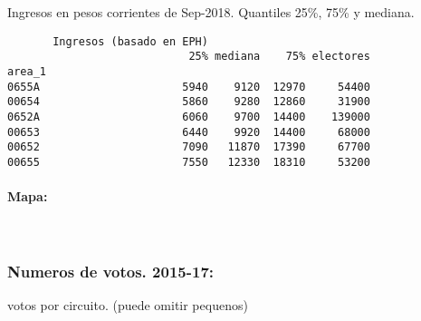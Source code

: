 \documentclass[11pt]{article}
\begin{document}
    
    Ingresos en pesos corrientes de Sep-2018. Quantiles 25\%, 75\% y
mediana.

    
    
    \begin{verbatim}
       Ingresos (basado en EPH)                         
                            25% mediana    75% electores
area_1                                                  
0655A                      5940    9120  12970     54400
00654                      5860    9280  12860     31900
0652A                      6060    9700  14400    139000
00653                      6440    9920  14400     68000
00652                      7090   11870  17390     67700
00655                      7550   12330  18310     53200
    \end{verbatim}

    
    \hypertarget{mapa}{%
\paragraph{Mapa:}\label{mapa}}

    
    \begin{center}
    \end{center}
    { \hspace*{\fill} \\}
    
    \hypertarget{numeros-de-votos.-2015-17}{%
\subsubsection{Numeros de votos.
2015-17:}\label{numeros-de-votos.-2015-17}}

    
    votos por circuito. (puede omitir pequenos)

    
    
\end{document}
